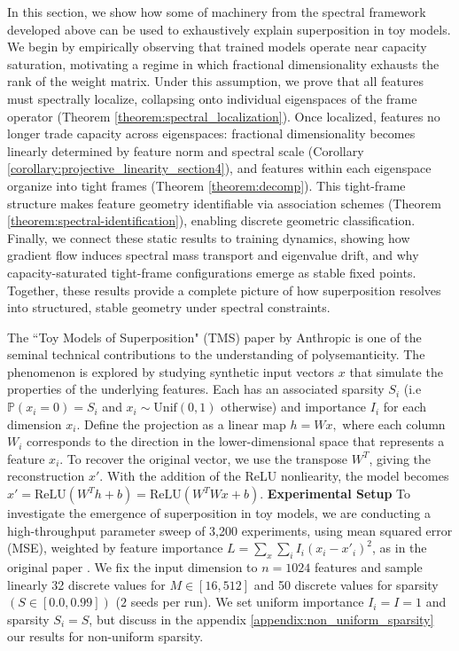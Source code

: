 \documentclass{article}
\theoremstyle{plain}
\numberwithin{equation}{section}
\theoremstyle{definition}
\theoremstyle{remark}
\begin{document}
In this section, we show how some of machinery from the spectral framework developed above can be used to exhaustively explain superposition in toy models. We begin by empirically observing that trained models operate near capacity saturation, motivating a regime in which fractional dimensionality exhausts the rank of the weight matrix. Under this assumption, we prove that all features must spectrally localize, collapsing onto individual eigenspaces of the frame operator (Theorem \ref{theorem:spectral_localization}). Once localized, features no longer trade capacity across eigenspaces: fractional dimensionality becomes linearly determined by feature norm and spectral scale (Corollary \ref{corollary:projective_linearity_section4}), and features within each eigenspace organize into tight frames (Theorem \ref{theorem:decomp}). This tight-frame structure makes feature geometry identifiable via association schemes (Theorem \ref{theorem:spectral-identification}), enabling discrete geometric classification. Finally, we connect these static results to training dynamics, showing how gradient flow induces spectral mass transport and eigenvalue drift, and why capacity-saturated tight-frame configurations emerge as stable fixed points. Together, these results provide a complete picture of how superposition resolves into structured, stable geometry under spectral constraints.


The ``Toy Models of Superposition" (TMS) paper by Anthropic \cite{toymodels} is one of the seminal technical contributions to the understanding of polysemanticity. The phenomenon is explored by studying  synthetic input vectors $x$ that simulate the properties of the underlying features. Each has an associated sparsity $S_i$ (i.e $\mathbb{P}(x_i=0) = S_i$ and $x_i\sim \text{Unif}(0, 1)$ otherwise) and importance $I_i$ for each dimension $x_i$. Define the projection as a linear map $h = W x ,$ where each column $W_i$ corresponds to the direction in the lower-dimensional space that represents a feature $x_i$. To recover the original vector, we use the transpose $W^T$, giving the reconstruction $x'$. With the addition of the ReLU nonliearity, the model becomes $x' = \text{ReLU}(W^T h + b) = \text{ReLU}(W^T W x + b)$. \newline 
\textbf{Experimental Setup}\newline
To investigate the emergence of superposition in toy models, we are conducting a high-throughput parameter sweep of 3,200 experiments, using mean squared error (MSE), weighted by feature importance $L = \sum_x \sum_i I_i (x_i - x'_i)^2$, as in the original paper \cite{toymodels}. We fix the input dimension to $n=1024$ features and sample linearly 32 discrete values for $M\in [16,512]$ and 50 discrete values for sparsity $(S\in[0.0,0.99])$ ($2$ seeds per run). We set uniform importance $I_i=I=1$ and sparsity $S_i=S$, but discuss in the appendix \ref{appendix:non_uniform_sparsity} our results for non-uniform sparsity. 
\end{document}
